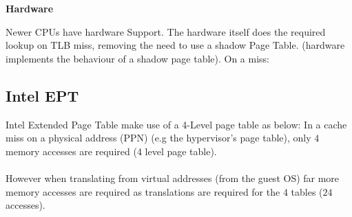 \documentclass{report}
\begin{document}
            \begin{minipage}[t]{0.45\textwidth}
                \centerline{\textbf{Hardware}}
                Newer CPUs have hardware Support. The hardware itself does the 
                required lookup on TLB miss, removing the need to use a shadow 
                Page Table. (hardware implements the behaviour of a shadow page table).
                On a  miss:
            \end{minipage}

            \subsection*{Intel EPT}
                Intel Extended Page Table make use of a 4-Level page table as below:
                In a  cache miss on a physical address (PPN) (e.g the hypervisor's page table), only $4$ memory accesses are required (4 level page table).
                \\
                \\ However when translating from virtual addresses (from the guest OS) far more memory accesses are required as translations are required for the 4 tables ($24$ accesses).
\end{document}
